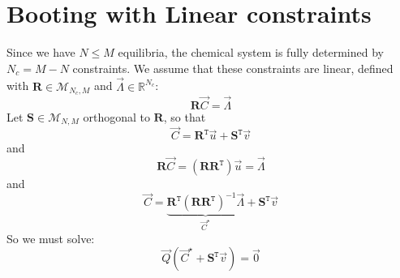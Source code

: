 \documentclass[aps,12pt]{revtex4}
\newcommand{\trn}[1]{{#1}^{\mathtt{T}}}
\begin{document}
\section{Booting  with Linear constraints}
Since we have $N\leq M$ equilibria, the chemical system is fully determined by
$N_c=M-N$ constraints.
We assume that these constraints are linear, defined with $\bm{R}\in\mathcal{M}_{N_c,M}$ and $\vec{\Lambda}\in\mathbb{R}^{N_c}$:
\begin{equation}
	\bm{R} \vec{C} = \vec{\Lambda}
\end{equation}
Let $\bm{S}\in\mathcal{M}_{N,M}$ orthogonal to $\bm{R}$, so that
\begin{equation}
	\vec{C} = \trn{\bm{R}} \vec{u} + \trn{\bm{S}} \vec{v}
\end{equation}
and
\begin{equation}
	\bm{R} \vec{C} = \left(\bm{R} \trn{\bm{R}}\right) \vec{u} = \vec{\Lambda}
\end{equation}
and
\begin{equation}
	\vec{C} = \underbrace{\trn{\bm{R}} \left(\bm{R} \trn{\bm{R}}\right)^{-1} \vec{\Lambda}}_{\vec{C}^\star} + \trn{\bm{S}} \vec{v}
\end{equation}
So we must solve:
\begin{equation}
	\vec{Q} \left( \vec{C}^\star + \trn{\bm{S}}\vec{v} \right) = \vec{0}
\end{equation}
\end{document}
